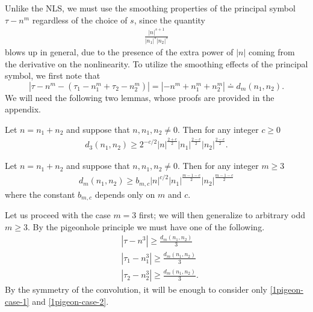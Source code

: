 %
%
Unlike the NLS, we must use the smoothing properties of the
principal symbol $\tau - n^m$ regardless of the choice of $s$, since the quantity
%
%
\begin{equation}
	\label{1convo-multiplier}
	\begin{split}
		\frac{|n|^{s+1}}{|n_1|^s |n_2|^s }
	\end{split}
\end{equation}
%
%
blows up in general, due to the presence of the extra power of $|n|$ coming from the derivative on
the nonlinearity. To utilize the smoothing effects of the principal symbol, we
first note that 
$$| \tau - n^m - \left( \tau_1 - n_1^m 
+ \tau_2 - n_2^m  \right ) | = | - n^m + n_1^m +
n_2^m| \doteq d_m(n_1, n_2).$$ We will need the following two lemmas, whose
proofs are provided in the appendix.
%
%
%
\begin{lemma}
	\label{1lem:number-theory1}
	Let $n=n_1 + n_2$ and suppose that $n, n_1, n_2\neq
	0$. Then for any integer $c \ge 0$
%
%
\begin{equation}
	\begin{split}
		\label{1number-theory1}
		d_3(n_1,n_2) \ge 2^{-c/2} | n |^{\frac{2+c}{2}} | n_{1}
		|^{\frac{2-c}{2}}| n_2 |^{\frac{2-c}{2}}.
	\end{split}
\end{equation}
%
%
\end{lemma}
%
%
%
%
%
%
\begin{lemma}
	\label{1lem:number-theory}
	Let $n=n_1 + n_2$ and suppose that $n, n_1, n_2\neq
	0$. Then for any integer  $m \ge 3$
%
%
\begin{equation}
	\begin{split}
		\label{1number-theory}
		d_m(n_1,n_2) \ge b_{m, c } 
		|n|^{c/2} |n_1|^{\frac{m-1-c}{2}} | n_2 |^{\frac{m-1-c}{2}}
		\end{split}
\end{equation}
%
%
where the constant $b_{m,c}$ depends only on $m$ and $c$. 
\end{lemma}
%
%
%
%
Let us proceed with the case $m=3$ first; we will then generalize to arbitrary
odd $m \ge 3$. By the pigeonhole principle we must have one of the 
following.
%
%
\begin{align}
	\label{1pigeon-case-1}
	& |\tau - n^3| \ge \frac{d_m(n_1, n_2)}{3} 
		 \\
		\label{1pigeon-case-2}
		& | \tau_1 - n_1^3 | \ge \frac{d_m(n_1, n_2)}{3} 
		 \\
		\label{1pigeon-case-3}
		& | \tau_2 - n_2^3 | \ge \frac{d_m(n_1, n_2)}{3}.
		\end{align}
%
%
By the symmetry of the convolution, it will be enough to consider only
\eqref{1pigeon-case-1} and \eqref{1pigeon-case-2}.
%
%
%
